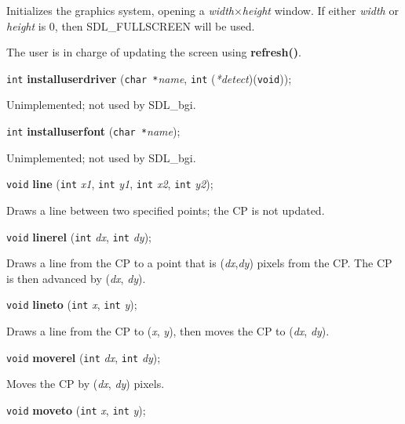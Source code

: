 \documentclass[a4paper,11pt]{article}
\newcommand{\SDLbgi}{SDL\_bgi}
\newcommand{\V}{\texttt{void}}      %
\newcommand{\I}{\texttt{int}}       %
\newcommand{\C}{\texttt{char *}}    %
\newcommand{\func}[1]{\textbf{#1}}  %
\newcommand{\A}[1]{\emph{#1}}       %
\newenvironment{bgi}
{ %
  \begin{snugshade}
}
{ %
  \end{snugshade}
}
\begin{document}
Initializes the graphics system, opening a \A{width}$\times$\A{height}
window. If either \A{width} or \A{height} is 0, then
SDL\-\_FULL\-SCREEN will be used.

The user is in charge of updating the screen using \func{refresh()}.


\begin{bgi}
\I{} \func{installuserdriver} (\C{}\A{name}, \I{} (\A{*detect})(\V{})); 
\end{bgi}

Unimplemented; not used by \SDLbgi.


\begin{bgi}
\I{} \func{installuserfont} (\C{}\A{name}); 
\end{bgi}

Unimplemented; not used by \SDLbgi.


\begin{bgi}
\V{} \func{line} (\I{} \A{x1}, \I{} \A{y1}, \I{} \A{x2}, \I{} \A{y2});
\end{bgi}

Draws a line between two specified points; the CP is not updated.


\begin{bgi}
\V{} \func{linerel} (\I{} \A{dx}, \I{} \A{dy});
\end{bgi}

Draws a line from the CP to a point that is (\A{dx},\A{dy}) pixels
from the CP. The CP is then advanced by (\A{dx}, \A{dy}).


\begin{bgi}
\V{} \func{lineto} (\I{} \A{x}, \I{} \A{y});
\end{bgi}

Draws a line from the CP to (\A{x}, \A{y}), then moves the CP to
(\A{dx}, \A{dy}).


\begin{bgi}
\V{} \func{moverel} (\I{} \A{dx}, \I{} \A{dy});
\end{bgi}

Moves the CP by (\A{dx}, \A{dy}) pixels.


\begin{bgi}
\V{} \func{moveto} (\I{} \A{x}, \I{} \A{y});
\end{bgi}
\end{document}
